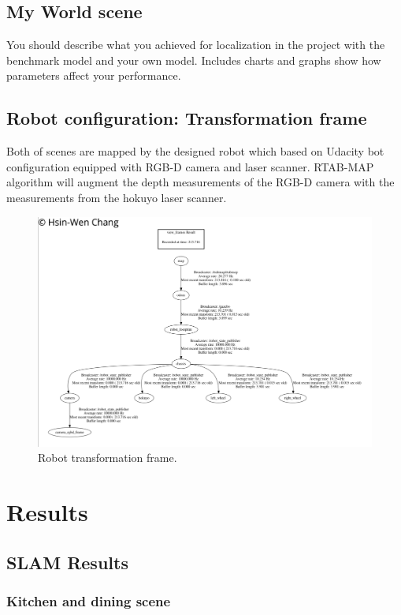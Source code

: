 \documentclass[10pt,journal,compsoc]{IEEEtran}
\begin{document}
\subsection{My World scene}
You should describe what you achieved for localization in the project with the benchmark model and your own model. Includes charts and graphs show how parameters affect your performance. 
\subsection{Robot configuration: Transformation frame}
Both of scenes are mapped by the designed robot which based on Udacity bot configuration equipped with RGB-D camera and laser scanner. RTAB-MAP algorithm will augment the depth measurements of the RGB-D camera with the measurements from the hokuyo laser scanner.

\begin{figure}[thpb]
      \centering
      \includegraphics[width=\linewidth]{TransformFrames.png}
      \caption{Robot transformation frame.}
      \label{fig:robot1}
\end{figure}
\section{Results}

\subsection{SLAM Results}
\subsubsection{Kitchen and dining scene}
\end{document}
